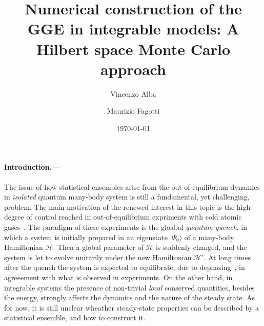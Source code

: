 \documentclass[twocolumn,superscriptaddress,prb,10pt]{revtex4-1}
\begin{document}
\title{Numerical construction of the GGE in integrable models: A Hilbert space Monte Carlo 
approach} 

\author{Vincenzo Alba}

\author{Maurizio Fagotti}

\date{\today}




\begin{abstract} 


\end{abstract}


\maketitle


\paragraph*{Introduction.---}

The issue of how statistical ensembles arise from the out-of-equilibrium 
dynamics in {\it isolated} quantum many-body system is still a fundamental, 
yet challenging, problem. The main motivation of the renewed interest 
in this topic is the high degree of control reached in out-of-equilibrium 
expriments with cold atomic gases~\cite{greiner-2002,kinoshita-2006,
hofferberth-2007,bloch-2008,trotzky-2012,gring-2012,cheneau-2012,
schneider-2012,kunhert-2013,langen-2013,meinert-2013,fukuhara-2013,
ronzheimer-2013,braun-2014}. 
The paradigm of these experiments is the gloabal {\it quantum quench}, in 
which a system is initially prepared in an eigenstate $|\Psi_0\rangle$ of a 
many-body Hamiltonian ${\mathcal H}$. Then a global parameter of ${\mathcal H}$ 
is suddenly changed, and the system is let to evolve unitarily under the 
new Hamiltonian ${\mathcal H}'$. 
At long times after the quench the system is expected to equilibrate, due to 
dephasing~\cite{barthel-2008}, in agreeement with what is observed in experiments. 
On the other hand, in integrable systems the 
presence of non-trivial {\it local} conserved quantities, besides the energy, 
strongly affects the dynamics and the nature of the steady state. As for now,  
it is still unclear wheather steady-state properties can be described by a 
statistical ensemble, and how to construct it. 
\end{document}

